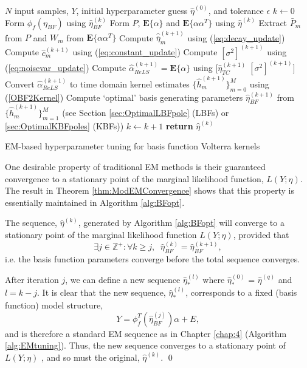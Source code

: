 \begin{algorithm}[h]
\begin{algorithmic}[1]
\Require $N$ input samples, $Y$, initial hyperparameter guess $\hat{\eta}^{(0)}$, and tolerance $\epsilon$
\State $k \gets 0$
\State Form $\phi_{f}(\eta_{BF})$ using $\hat{\eta}_{BF}^{(k)}$
\State Form $P$, $\textbf{E} \{ \alpha \}$ and $\textbf{E} \{ \alpha \alpha^T \}$ using $\hat{\eta}^{(k)}$
\State Extract $\bar{P}_m$ from $P$ and $W_m$ from $\textbf{E} \{ \alpha \alpha^T \}$
	\State Compute $\hat{\bar{\eta}}_m^{(k+1)}$ using (\ref{eq:decay_update})
\EndIf
\State Compute $\hat{c}_m^{(k+1)}$ using (\ref{eq:constant_update})
\EndFor
\State Compute $[\sigma^2]^{(k+1)}$ using (\ref{eq:noisevar_update})
\State Compute $\hat{\alpha}_{ReLS}^{(k+1)} = \textbf{E} \{ \alpha \}$ using $\big[\hat{\eta}_{TC}^{(k+1)} \; [\sigma^2]^{(k+1)}\big]$
\State Convert $\hat{\alpha}_{ReLS}^{(k+1)}$ to time domain kernel estimates $\{\hat{h}^{(k+1)}_m\}_{m=0}^{M}$ using (\ref{OBF2Kernel})
\State Compute `optimal' basis generating parameters $\hat{\eta}_{BF}^{(k+1)}$ from $\{\hat{h}^{(k+1)}_m\}_{m=1}^{M}$ (see Section \ref{sec:OptimalLBFpole} (LBFs) or \ref{sec:OptimalKBFpoles} (KBFs))
\State $k \gets k+1$
\EndWhile
\State \textbf{return} $\hat{\eta}^{(k)}$
\end{algorithmic}
\caption{EM-based hyperparameter tuning for basis function Volterra kernels}
\label{alg:BFopt}
\end{algorithm}

One desirable property of traditional EM methods is their guaranteed convergence to a stationary point of the marginal likelihood function, $L(Y;\eta)$. The result in Theorem \ref{thm:ModEMConvergence} shows that this property is essentially maintained in Algorithm \ref{alg:BFopt}.
\begin{thm}
\label{thm:ModEMConvergence}
The sequence, $\hat{\eta}^{(k)}$, generated by Algorithm \ref{alg:BFopt} will converge to a stationary point of the marginal likelihood function $L(Y;\eta)$, provided that $$\exists j \in \mathbb{Z}^+: \forall k \geq j, \; \; \hat{\eta}_{BF}^{(k)} = \hat{\eta}_{BF}^{(k+1)},$$ i.e. the basis function parameters converge before the total sequence converges.
\end{thm}
\begin{proof*}
After iteration $j$, we can define a new sequence $\hat{\eta}_*^{(l)}$ where $\hat{\eta}_*^{(0)}$ = $\hat{\eta}^{(q)}$ and $l = k-j$. It is clear that the new sequence, $\hat{\eta}_*^{(l)}$, corresponds to a fixed (basis function) model structure, $$Y = \phi_{f}^T(\hat{\eta}_{BF}^{(j)}) \alpha + E,$$ and is therefore a standard EM sequence as in Chapter \ref{chap:4} (Algorithm \ref{alg:EMtuning}). Thus, the new sequence converges to a stationary point of $L(Y;\eta)$ \cite{Wu1983}, and so must the original, $\hat{\eta}^{(k)}$. \hfill \qed
\end{proof*}

